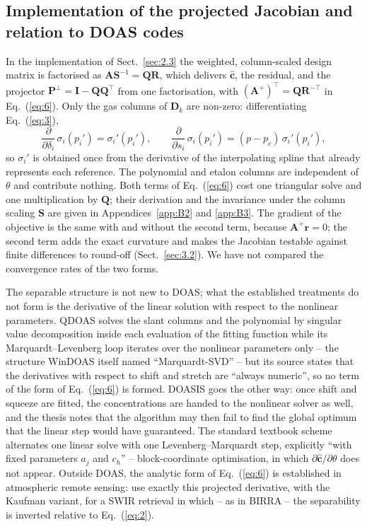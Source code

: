 \subsection{Implementation of the projected Jacobian and relation to DOAS codes}
\label{app:B5}

In the implementation of Sect.~\ref{sec:2.3} the weighted, column-scaled design matrix is factorised as
$\mathbf{A}\mathbf{S}^{-1}=\mathbf{Q}\mathbf{R}$, which delivers $\hat{\mathbf{c}}$, the residual, and the projector
$\mathbf{P}^{\perp}=\mathbf{I}-\mathbf{Q}\mathbf{Q}^{\!\top}$ from one factorisation, with
$(\mathbf{A}^{+})^{\!\top}=\mathbf{Q}\mathbf{R}^{-\top}$ in Eq.~(\ref{eq:6}). Only the gas columns of
$\mathbf{D}_k$ are non-zero: differentiating Eq.~(\ref{eq:3}),
\begin{equation}
\frac{\partial}{\partial \delta_i}\,\sigma_i(p_i') = \sigma_i'(p_i'),
\qquad
\frac{\partial}{\partial s_i}\,\sigma_i(p_i') = (p-p_c)\,\sigma_i'(p_i'),
\label{eq:7}
\end{equation}
so $\sigma_i'$ is obtained once from the derivative of the interpolating spline that
already represents each reference. The polynomial and etalon columns are independent of
$\theta$ and contribute nothing. Both terms of Eq.~(\ref{eq:6}) cost one triangular solve and
one multiplication by $\mathbf{Q}$; their derivation and the invariance under the column scaling $\mathbf{S}$ are
given in Appendices~\ref{app:B2} and \ref{app:B3}. The gradient of the objective is the same with and without
the second term, because $\mathbf{A}^{+}\mathbf{r} = 0$; the second term adds the exact curvature and makes the
Jacobian testable against finite differences to round-off (Sect.~\ref{sec:3.2}). We have not compared the
convergence rates of the two forms.

The separable structure is not new to DOAS; what the established treatments do not form is the derivative of
the linear solution with respect to the nonlinear parameters. QDOAS solves the slant columns and the polynomial
by singular value decomposition inside each evaluation of the fitting function while its
Marquardt--Levenberg loop iterates over the nonlinear parameters only -- the structure WinDOAS itself named
``Marquardt-SVD'' -- but its source states that the derivatives with respect to shift and stretch are ``always
numeric'', so no term of the form of Eq.~(\ref{eq:6}) is formed. DOASIS \citep{Kraus_2006} goes the other way:
once shift and squeeze are fitted, the concentrations are handed to the nonlinear solver as well, and the thesis
notes that the algorithm may then fail to find the global optimum that the linear step would have guaranteed.
The standard textbook scheme \citep[][Sect.~8.3.4]{Platt} alternates one linear solve with one
Levenberg--Marquardt step, explicitly ``with fixed parameters $a_j$ and $c_h$'' -- block-coordinate
optimisation, in which $\partial \hat{\mathbf{c}}/\partial\theta$ does not appear. Outside DOAS, the analytic form
of Eq.~(\ref{eq:6}) is established in atmospheric remote sensing: \citet{B_rligea_2023} use exactly this
projected derivative, with the Kaufman variant, for a SWIR retrieval in which -- as in BIRRA
\citep{Gimeno_Garc_a_2011} -- the separability is inverted relative to Eq.~(\ref{eq:2}).

